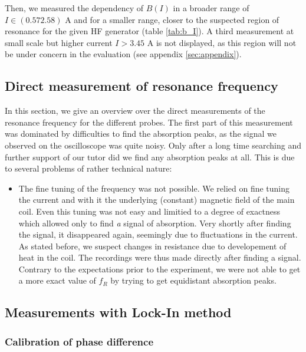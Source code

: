 Then, we measured the dependency of $B(I)$ in a broader range of $I \in (0.57 2.58)$ A 
and for a smaller range, closer to the suspected region of resonance 
for the given HF generator (table \ref{tab:b_I}). A third measurement at small scale 
but higher current $I > 3.45$ A is not displayed, as this region will not be under 
concern in the evaluation (see appendix \ref{sec:appendix}). 

\FloatBarrier

\subsection{Direct measurement of resonance frequency}
In this section, we give an overview over the direct measurements of the resonance frequency
for the different probes. The first part of this measurement was dominated by difficulties 
to find the absorption peaks, as the signal we observed on the oscilloscope was quite noisy. 
Only after a long time searching and further support of our tutor did we find any absorption 
peaks at all. This is due to several problems of rather technical nature:
\begin{itemize}
    \item
        The fine tuning of the frequency was not possible. We relied on fine tuning the 
        current and with it the underlying (constant) magnetic field of the main coil. 
        Even this tuning was not easy and limitied to a degree of exactness which 
        allowed only to find \emph{a} signal of absorption. Very shortly after finding the 
        signal, it disappeared again, seemingly due to fluctuations in the current. As stated 
        before, we suspect changes in resistance due to developement of heat in the coil. 
        The recordings were thus made directly after finding a signal. Contrary to the 
        expectations prior to the experiment, we were not able to get a more exact 
        value of $f_R$ by trying to get equidistant absorption peaks. 
\end{itemize}



\subsection{Measurements with Lock-In method}
\subsubsection{Calibration of phase difference}

